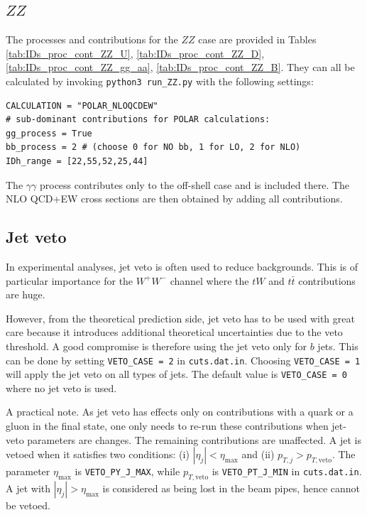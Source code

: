 \documentclass[english,12pt]{article}
\begin{document}
\subsection{$ZZ$}
\label{sec:cal_xs_ZZ}
The processes and contributions for the $ZZ$ case are provided in Tables \ref{tab:IDs_proc_cont_ZZ_U}, \ref{tab:IDs_proc_cont_ZZ_D}, 
\ref{tab:IDs_proc_cont_ZZ_gg_aa}, \ref{tab:IDs_proc_cont_ZZ_B}. 
They can all be calculated by invoking {\tt python3 run\_ZZ.py} with the following settings:
\begin{verbatim}
CALCULATION = "POLAR_NLOQCDEW"
# sub-dominant contributions for POLAR calculations:
gg_process = True
bb_process = 2 # (choose 0 for NO bb, 1 for LO, 2 for NLO)
IDh_range = [22,55,52,25,44]
\end{verbatim}
The $\gamma\gamma$ process contributes only to the off-shell case and is included there. 
The NLO QCD+EW cross sections are then obtained by adding all contributions. 
\subsection{Jet veto}
\label{sec:jet_veto}
In experimental analyses, jet veto is often used to reduce backgrounds. This is of particular importance for 
the $W^+W^-$ channel where the $tW$ and $t\bar{t}$ contributions are huge. 

However, from the theoretical prediction side, jet veto has to be used with great care because it introduces additional 
theoretical uncertainties due to the veto threshold. A good compromise is therefore using the jet veto only for $b$ jets. 
This can be done by setting {\tt VETO\_CASE = 2} in {\tt cuts.dat.in}. 
Choosing {\tt VETO\_CASE = 1} will apply the jet veto on all types of jets. 
The default value is {\tt VETO\_CASE = 0} where no jet veto is used.

A practical note. As jet veto has effects only on contributions with a quark or a gluon in the final state, one only needs 
to re-run these contributions when jet-veto parameters are changes. The remaining contributions are unaffected. 
A jet is vetoed when it satisfies two conditions: (i) $|\eta_j| < \eta_\text{max}$ and (ii) $p_{T,j} > p_{T,\text{veto}}$. 
The parameter $\eta_\text{max}$ is {\tt VETO\_PY\_J\_MAX}, while $p_{T,\text{veto}}$ is {\tt VETO\_PT\_J\_MIN} in {\tt cuts.dat.in}.
A jet with $|\eta_j| > \eta_\text{max}$ is considered as being lost in the beam pipes, hence cannot be vetoed.  
\end{document}
